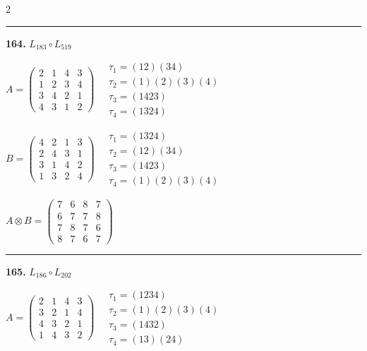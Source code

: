 \begin{multicols}{2}
\vspace{0.3em}
\hrule
\vspace{0.3em}

\noindent\textbf{164.} $L_{183} \circ L_{519}$

$A = \begin{pmatrix} 2 & 1 & 4 & 3 \\ 1 & 2 & 3 & 4 \\ 3 & 4 & 2 & 1 \\ 4 & 3 & 1 & 2 \end{pmatrix} \quad \begin{matrix} \tau_{1}=(1 2)(3 4) \\ \tau_{2}=(1)(2)(3)(4) \\ \tau_{3}=(1 4 2 3) \\ \tau_{4}=(1 3 2 4) \end{matrix}$

$B = \begin{pmatrix} 4 & 2 & 1 & 3 \\ 2 & 4 & 3 & 1 \\ 3 & 1 & 4 & 2 \\ 1 & 3 & 2 & 4 \end{pmatrix} \quad \begin{matrix} \tau_{1}=(1 3 2 4) \\ \tau_{2}=(1 2)(3 4) \\ \tau_{3}=(1 4 2 3) \\ \tau_{4}=(1)(2)(3)(4) \end{matrix}$

$A \otimes B = \begin{pmatrix} 7 & 6 & 8 & 7 \\ 6 & 7 & 7 & 8 \\ 7 & 8 & 7 & 6 \\ 8 & 7 & 6 & 7 \end{pmatrix}$

\vspace{0.3em}
\hrule
\vspace{0.3em}

\noindent\textbf{165.} $L_{186} \circ L_{202}$

$A = \begin{pmatrix} 2 & 1 & 4 & 3 \\ 3 & 2 & 1 & 4 \\ 4 & 3 & 2 & 1 \\ 1 & 4 & 3 & 2 \end{pmatrix} \quad \begin{matrix} \tau_{1}=(1 2 3 4) \\ \tau_{2}=(1)(2)(3)(4) \\ \tau_{3}=(1 4 3 2) \\ \tau_{4}=(1 3)(2 4) \end{matrix}$


\end{multicols}
